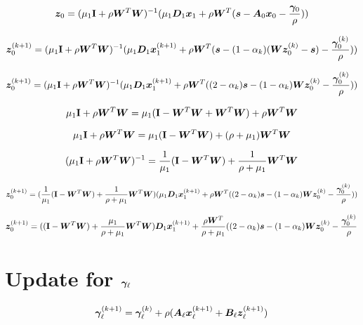 \documentclass{article}
\begin{document}
\begin{equation}
\bm{z}_0 = (\mu_1{\bf I} + \rho\bm{W}^T\bm{W})^{-1}(\mu_1\bm{D}_1\bm{x}_1 + \rho\bm{W}^T(\bm{s} - \bm{A}_0\bm{x}_0 - \frac{\bm{\gamma}_0}{\rho}))
\end{equation}

\begin{equation}
\bm{z}_0^{(k + 1)} = (\mu_1{\bf I} + \rho\bm{W}^T\bm{W})^{-1}(\mu_1\bm{D}_1\bm{x}_1^{(k + 1)} + \rho\bm{W}^T(\bm{s} - (1 - \alpha_k)(\bm{W}\bm{z}_0^{(k)} - \bm{s}) - \frac{\bm{\gamma}_0^{(k)}}{\rho}))
\end{equation}

\begin{equation}
\bm{z}_0^{(k + 1)} = (\mu_1{\bf I} + \rho\bm{W}^T\bm{W})^{-1}(\mu_1\bm{D}_1\bm{x}_1^{(k + 1)} + \rho\bm{W}^T((2 - \alpha_k)\bm{s} - (1 - \alpha_k)\bm{W}\bm{z}_0^{(k)} - \frac{\bm{\gamma}_0^{(k)}}{\rho}))
\end{equation}

\begin{equation}
\mu_1{\bf I} + \rho\bm{W}^T\bm{W} = \mu_1({\bf I} - \bm{W}^T\bm{W} + \bm{W}^T\bm{W}) + \rho\bm{W}^T\bm{W} 
\end{equation}

\begin{equation}
\mu_1{\bf I} + \rho\bm{W}^T\bm{W} = \mu_1({\bf I} - \bm{W}^T\bm{W}) + (\rho + \mu_1)\bm{W}^T\bm{W} 
\end{equation}

\begin{equation}
(\mu_1{\bf I} + \rho\bm{W}^T\bm{W})^{-1} = \frac{1}{\mu_1}({\bf I} - \bm{W}^T\bm{W}) + \frac{1}{\rho + \mu_1}\bm{W}^T\bm{W} 
\end{equation}

\begin{equation}
\bm{z}_0^{(k + 1)} = (\frac{1}{\mu_1}({\bf I} - \bm{W}^T\bm{W}) + \frac{1}{\rho + \mu_1}\bm{W}^T\bm{W})(\mu_1\bm{D}_1\bm{x}_1^{(k + 1)} + \rho\bm{W}^T((2 - \alpha_k)\bm{s} - (1 - \alpha_k)\bm{W}\bm{z}_0^{(k)} - \frac{\bm{\gamma}_0^{(k)}}{\rho}))
\end{equation}

\begin{equation}
\bm{z}_0^{(k + 1)} = (({\bf I} - \bm{W}^T\bm{W}) + \frac{\mu_1}{\rho + \mu_1}\bm{W}^T\bm{W})\bm{D}_1\bm{x}_1^{(k + 1)} + \frac{\rho\bm{W}^T}{\rho + \mu_1}((2 - \alpha_k)\bm{s} - (1 - \alpha_k)\bm{W}\bm{z}_0^{(k)} - \frac{\bm{\gamma}_0^{(k)}}{\rho}
\end{equation}

\section{Update for $\bm{\gamma}_{\ell}$}

\begin{equation}
\bm{\gamma}_{\ell}^{(k + 1)} = \bm{\gamma}_{\ell}^{(k)} + \rho(\bm{A}_{\ell}\bm{x}_{\ell}^{(k + 1)} + \bm{B}_{\ell}\bm{z}_{\ell}^{(k + 1)})
\end{equation}
\end{document}
